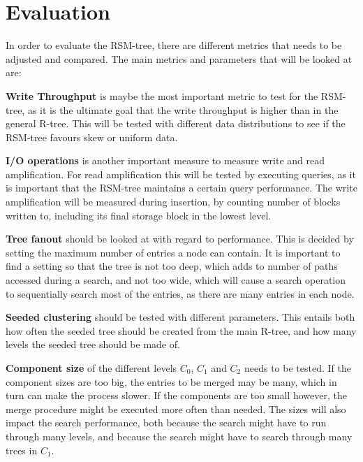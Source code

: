 \section{Evaluation}
In order to evaluate the RSM-tree, there are different metrics that needs to be adjusted and compared. The main metrics and parameters that will be looked at are:\newline

\noindent
\textbf{Write Throughput} is maybe the most important metric to test for the RSM-tree, as it is the ultimate goal that the write throughput is higher than in the general R-tree. This will be tested with different data distributions to see if the RSM-tree favours skew or uniform data. \newline

\noindent
\textbf{I/O operations} is another important measure to measure write and read amplification. For read amplification this will be tested by executing queries, as it is important that the RSM-tree maintains a certain query performance. The write amplification will be measured during insertion, by counting number of blocks written to, including its final storage block in the lowest level. \newline

\noindent
\textbf{Tree fanout} should be looked at with regard to performance. This is decided by setting the maximum number of entries a node can contain. It is important to find a setting so that the tree is not too deep, which adds to number of paths accessed during a search, and not too wide, which will cause a search operation to sequentially search most of the entries, as there are many entries in each node. \newline

\noindent
\textbf{Seeded clustering} should be tested with different parameters. This entails both how often the seeded tree should be created from the main R-tree, and how many levels the seeded tree should be made of. \newline

\noindent
\textbf{Component size} of the different levels $C_0$, $C_1$ and $C_2$ needs to be tested. If the component sizes are too big, the entries to be merged may be many, which in turn can make the process slower. If the components are too small however, the merge procedure might be executed more often than needed. The sizes will also impact the search performance, both because the search might have to run through many levels, and because the search might have to search through many trees in $C_1$.\newline

